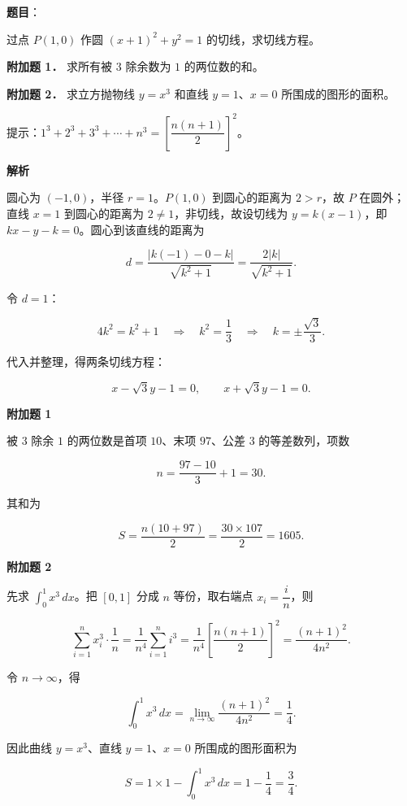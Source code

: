 \begin{answer}

\textbf{题目}：

过点 $P(1,0)$ 作圆 $(x+1)^2+y^2=1$ 的切线，求切线方程。

\textbf{附加题 1．} 求所有被 $3$ 除余数为 $1$ 的两位数的和。

\textbf{附加题 2．} 求立方抛物线 $y=x^3$ 和直线 $y=1$、$x=0$ 所围成的图形的面积。

\begin{gktip}
提示：$1^3+2^3+3^3+\cdots+n^3=\left[\dfrac{n(n+1)}{2}\right]^2$。
\end{gktip}

\textbf{解析}

圆心为 $(-1,0)$，半径 $r=1$。$P(1,0)$ 到圆心的距离为 $2>r$，故 $P$ 在圆外；直线 $x=1$ 到圆心的距离为 $2\ne1$，非切线，故设切线为 $y=k(x-1)$，即 $kx-y-k=0$。圆心到该直线的距离为

\nopagebreak[4]
\[
d=\frac{|k(-1)-0-k|}{\sqrt{k^2+1}}=\frac{2|k|}{\sqrt{k^2+1}}.
\]

令 $d=1$：

\nopagebreak[4]
\[
4k^2=k^2+1\quad\Longrightarrow\quad k^2=\frac13\quad\Longrightarrow\quad k=\pm\frac{\sqrt3}3.
\]

代入并整理，得两条切线方程：

\nopagebreak[4]
\[
x-\sqrt3y-1=0,\qquad x+\sqrt3y-1=0.
\]

\textbf{附加题 1}

被 $3$ 除余 $1$ 的两位数是首项 $10$、末项 $97$、公差 $3$ 的等差数列，项数

\nopagebreak[4]
\[
n=\frac{97-10}3+1=30.
\]

其和为

\nopagebreak[4]
\[
S=\frac{n(10+97)}2=\frac{30\times107}2=1605.
\]

\textbf{附加题 2}

先求 $\displaystyle\int_0^1x^3\,dx$。把 $[0,1]$ 分成 $n$ 等份，取右端点 $x_i=\dfrac in$，则

\nopagebreak[4]
\[
\sum_{i=1}^n x_i^3\cdot\frac1n=\frac1{n^4}\sum_{i=1}^ni^3
=\frac1{n^4}\left[\frac{n(n+1)}2\right]^2
=\frac{(n+1)^2}{4n^2}.
\]

令 $n\to\infty$，得

\nopagebreak[4]
\[
\int_0^1x^3\,dx=\lim_{n\to\infty}\frac{(n+1)^2}{4n^2}=\frac14.
\]

因此曲线 $y=x^3$、直线 $y=1$、$x=0$ 所围成的图形面积为

\nopagebreak[4]
\[
S=1\times1-\int_0^1x^3\,dx=1-\frac14=\frac34.
\]


\end{answer}